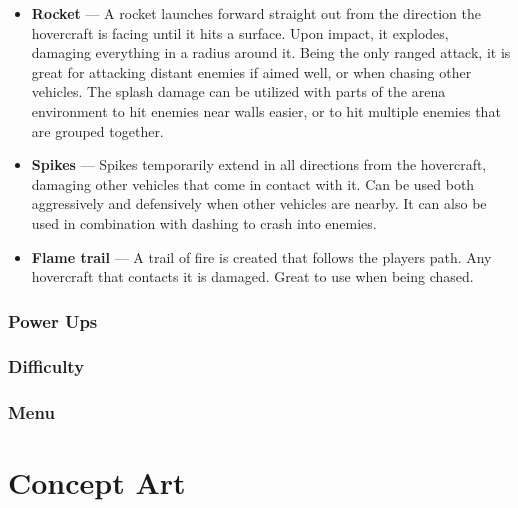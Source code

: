 \documentclass{article}
\theoremstyle{definition}
\begin{document}
\begin{itemize}
  \item \textbf{Rocket} --- A rocket launches forward straight out from the
    direction the hovercraft is facing until it hits a surface. Upon impact, it
    explodes, damaging everything in a radius around it. Being the only ranged
    attack, it is great for attacking distant enemies if aimed well, or when
    chasing other vehicles. The splash damage can be utilized with parts of the
    arena environment to hit enemies near walls easier, or to hit multiple
    enemies that are grouped together.
  \item \textbf{Spikes} --- Spikes temporarily extend in all directions from
    the hovercraft, damaging other vehicles that come in contact with it. Can
    be used both aggressively and defensively when other vehicles are nearby.
    It can also be used in combination with dashing to crash into enemies.
  \item \textbf{Flame trail} --- A trail of fire is created that follows the
    players path. Any hovercraft that contacts it is damaged. Great to use when
    being chased.
\end{itemize}


\subsubsection{Power Ups}
\subsubsection{Difficulty}
\subsubsection{Menu}

\section{Concept Art}
\end{document}
